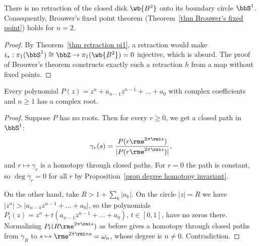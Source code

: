 \begin{cor}[No retraction]\label{cor no retraction D2 S1}
    There is no retraction of the closed disk $\wb{B^2}$ onto its boundary circle $\bbS^1$. Consequently, Brouwer's fixed point theorem (Theorem~\ref{thm Brouwer's fixed point}) holds for $n=2$.
\end{cor}
\begin{proof}
    By Theorem~\ref{thm retraction pi1}, a retraction would make $i_\ast:\pi_1(\bbS^1)\cong\bbZ\to \pi_1(\wb{B^2})=0$ injective, which is absurd. The proof of Brouwer's theorem constructs exactly such a retraction $h$ from a map without fixed points.
\end{proof}

\begin{cor}\label{cor FTA}
    Every polynomial $P(z)=z^n+a_{n-1}z^{n-1}+\dots+a_0$ with complex coefficients and $n\geq1$ has a complex root.
\end{cor}
\begin{proof}
    Suppose $P$ has no roots. Then for every $r\geq0$, we get a closed path in $\bbS^1$:
    \[\gamma_r(s)=\frac{P(r\rme^{2\pi\rmi s})}{\lvert P(r\rme^{2\pi\rmi s})\rvert},\]
    and $r\mapsto\gamma_r$ is a homotopy through closed paths. For $r=0$ the path is constant, so $\deg\gamma_r=0$ for all $r$ by Proposition~\ref{prop degree homotopy invariant}.

    On the other hand, take $R>1+\sum_k\lvert a_k\rvert$. On the circle $\lvert z\rvert=R$ we have $\lvert z^n\rvert>\lvert a_{n-1}z^{n-1}+\dots+a_0\rvert$, so the polynomials $P_t(z)=z^n+t(a_{n-1}z^{n-1}+\dots+a_0)$, $t\in[0,1]$, have no zeros there. Normalizing $P_t(R\rme^{2\pi\rmi s})$ as before gives a homotopy through closed paths from $\gamma_R$ to $s\mapsto \rme^{2\pi\rmi ns}=\omega_n$, whose degree is $n\neq0$. Contradiction.
\end{proof}

